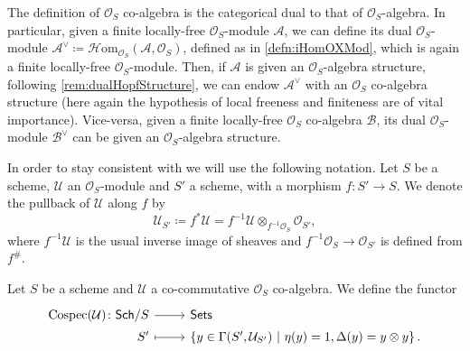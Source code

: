 \begin{rem}\label{rem:(co)algDuality}
	The definition of \(\mathcal{O}_{ S }\) co-algebra is the categorical dual 
	to that of \(\mathcal{O}_{ S }\)-algebra.
	In particular, given a finite locally-free \(\mathcal{O}_{ S }\)-module
	\(\mathcal{A}\), we can define its dual \(\mathcal{O}_{ S }\)-module
	$\mathcal{A}^{\vee} \coloneqq \mathcal{H}\mathrm{om}_{\mathcal{O}_{ S }} 
	\left( \mathcal{A}, \mathcal{O}_{ S } \right)$,
	defined as in \cref{defn:iHomOXMod}, which is again a
	finite locally-free $\mathcal{O}_{ S }$-module.
	Then, if \(\mathcal{A}\) is given an \(\mathcal{O}_{ S }\)-algebra structure,
	following \cref{rem:dualHopfStructure}, we can endow \(\mathcal{A}^\vee\)
	with an \(\mathcal{O}_{ S }\) co-algebra structure
	(here again the hypothesis of local freeness and finiteness are
	of vital importance).
	Vice-versa, given a finite locally-free \(\mathcal{O}_{ S }\) co-algebra
	\(\mathcal{B}\), its dual \(\mathcal{O}_{ S }\)-module \(\mathcal{B}^\vee\)
	can be given an \(\mathcal{O}_{ S }\)-algebra structure.
\end{rem}


\begin{ntt}[]
	In order to stay consistent with
	\cite{Messing} we will use the following notation.
	Let $S$ be a scheme, $\mathcal{U}$ an $\mathcal{O}_{ S }$-module
	and $S'$ a scheme, with a morphism
	$f\colon S' \to S$.
	We denote the pullback of $\mathcal{U}$ along $f$ by 
	\begin{equation*}
	\mathcal{U}_{S'} \coloneqq f^*\mathcal{U} = 
	f^{-1}\mathcal{U} \otimes_{f^{-1}\mathcal{O}_{ S }} \mathcal{O}_{ S' }
	,\end{equation*}
	where $f^{-1} \mathcal{U}$ is the usual inverse image of sheaves and
	$f^{-1}\mathcal{O}_{ S } \to \mathcal{O}_{ S' }$ is defined from $f^\#$.
\end{ntt}


\begin{defn}[]
	Let $S$ be a scheme and $\mathcal{U}$ a co-commutative
	$\mathcal{O}_{ S }$ co-algebra.
	We define the functor 
	\begin{equation*}
	\begin{tikzcd}[row sep = 0ex
		,/tikz/column 1/.append style={anchor=base east}
		,/tikz/column 2/.append style={anchor=base west}]
		\cospec(\mathcal{U})\colon 
		\mathsf{Sch}/S\arrow[r, "", rightarrow] &
		\mathsf{Sets} \\
		S' \arrow[r, "", mapsto] & 
		\left\{ y \in \Gamma(S', \mathcal{U}_{S'}) \ \middle|\ 
		\eta(y) = 1, \Delta(y) = y \otimes y\right\}
	.\end{tikzcd}
	\end{equation*} 
\end{defn}


